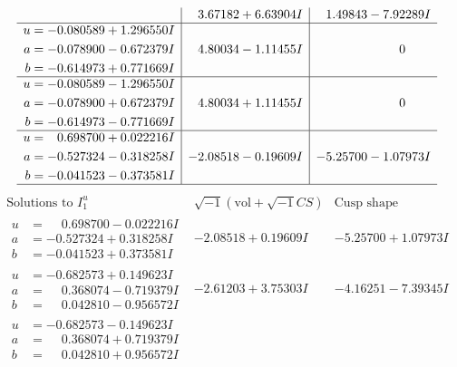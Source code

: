 \documentclass[1p]{elsarticle_modified}
\theoremstyle{definition}
\newcommand{\I}{\sqrt{-1}}
\begin{document}
$$\begin{array}{c|c|c}
 & \phantom{-}3.67182 + 6.63904 I & \phantom{-}1.49843 - 7.92289 I \\ \hline\begin{aligned}
u &= -0.080589 + 1.296550 I \\
a &= -0.078900 - 0.672379 I \\
b &= -0.614973 + 0.771669 I\end{aligned}
 & \phantom{-}4.80034 - 1.11455 I & \phantom{-0.000000 } 0 \\ \hline\begin{aligned}
u &= -0.080589 - 1.296550 I \\
a &= -0.078900 + 0.672379 I \\
b &= -0.614973 - 0.771669 I\end{aligned}
 & \phantom{-}4.80034 + 1.11455 I & \phantom{-0.000000 } 0 \\ \hline\begin{aligned}
u &= \phantom{-}0.698700 + 0.022216 I \\
a &= -0.527324 - 0.318258 I \\
b &= -0.041523 - 0.373581 I\end{aligned}
 & -2.08518 - 0.19609 I & -5.25700 - 1.07973 I\\
 \hline 
 \end{array}$$\newpage$$\begin{array}{c|c|c}  
\text{Solutions to }I^u_{1}& \I (\text{vol} + \sqrt{-1}CS) & \text{Cusp shape}\\
 \hline 
\begin{aligned}
u &= \phantom{-}0.698700 - 0.022216 I \\
a &= -0.527324 + 0.318258 I \\
b &= -0.041523 + 0.373581 I\end{aligned}
 & -2.08518 + 0.19609 I & -5.25700 + 1.07973 I \\ \hline\begin{aligned}
u &= -0.682573 + 0.149623 I \\
a &= \phantom{-}0.368074 - 0.719379 I \\
b &= \phantom{-}0.042810 - 0.956572 I\end{aligned}
 & -2.61203 + 3.75303 I & -4.16251 - 7.39345 I \\ \hline\begin{aligned}
u &= -0.682573 - 0.149623 I \\
a &= \phantom{-}0.368074 + 0.719379 I \\
b &= \phantom{-}0.042810 + 0.956572 I\end{aligned}

\end{array}$$
\end{document}
